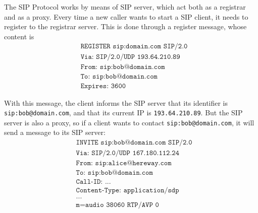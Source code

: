 \noindent The SIP Protocol works by means of SIP server, which act both as a registrar and as a proxy. Every time a new caller wants to start a SIP client, it needs to register to the registrar server. This is done through a register message, whose content is
\begin{align*}
    &\texttt{REGISTER sip:domain.com SIP/2.0}\\
    &\texttt{Via: SIP/2.0/UDP 193.64.210.89}\\
    &\texttt{From: sip:bob@domain.com}\\
    &\texttt{To: sip:bob@domain.com}\\
    &\texttt{Expires: 3600}
\end{align*}

\noindent With this message, the client informs the SIP server that its identifier is \texttt{sip:bob@domain.com}, and that its current IP is \texttt{193.64.210.89}.
But the SIP server is also a proxy, so if a client wants to contact \texttt{sip:bob@domain.com}, it will send a message to its SIP server:
\begin{align*}
    &\texttt{INVITE sip:bob@domain.com SIP/2.0}\\
    &\texttt{Via: SIP/2.0/UDP 167.180.112.24}\\
    &\texttt{From: sip:alice@hereway.com}\\
    &\texttt{To: sip:bob@domain.com}\\
    &\texttt{Call-ID: ...}\\
    &\texttt{Content-Type: application/sdp}\\
    &\texttt{...}\\
    &\texttt{m=audio 38060 RTP/AVP 0}
\end{align*}

